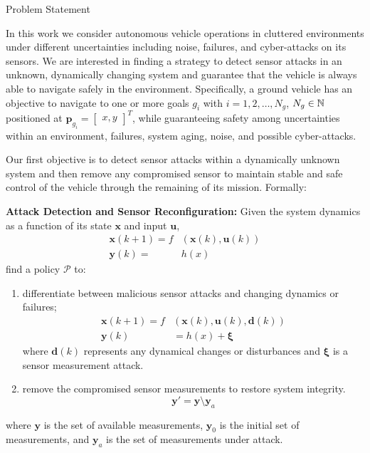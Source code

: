 \begin{section}{Problem Statement}
	
\label{sec:problem}

In this work we consider autonomous vehicle operations in cluttered environments under different uncertainties including noise, failures, and cyber-attacks on its sensors. 
We are interested in finding a strategy to detect sensor attacks in an unknown, dynamically changing system and guarantee that the vehicle is always able to navigate safely in the environment. Specifically, a ground vehicle has an objective to navigate to one or more goals $g_i$ with $ i = 1, 2, \dots, N_g$, $N_g \in \mathbb{N}$ positioned at $\bm{p}_{g_i}={\begin{bmatrix} x,y \end{bmatrix}}^T$, while guaranteeing safety among uncertainties within an environment, failures, system aging, noise, and possible cyber-attacks.



Our first objective is to detect sensor attacks within a dynamically unknown system and then remove any compromised sensor to maintain stable and safe control of the vehicle through the remaining of its mission. Formally:

\begin{problem} 
\label{problem1} {\textbf{Attack Detection and Sensor Reconfiguration:}} 
 Given the system dynamics as a function of its state $ \bm{x} $ and input $ \bm{u}$,
	\begin{equation}
	\begin{split}
		\bm{x}(k+1) = f&(\bm{x}(k), \bm{u}(k)) \\
		\bm{y}(k)=&h(x)
    \end{split}
	\end{equation}
find a policy $\mathcal{P}$ to:
\begin{enumerate}
	\item differentiate between malicious sensor attacks and changing dynamics or failures; 
	\begin{equation}
	\begin{split}
	\label{eq:detect_attack}
	    \bm{x}(k+1) = f&(\bm{x}(k), \bm{u}(k), \bm{d}(k)) \\
	    \bm{y}(k)&=h(x) + \bm{\xi}
	\end{split}    
	\end{equation}
	where $\bm{d}(k)$ represents any dynamical changes or disturbances and $\bm{\xi}$ is a sensor measurement attack.
	\item remove the compromised sensor measurements to restore system integrity.
	\begin{equation}
	\label{eq:remove_sensors}
	    \bm{y}'=\bm{y} \setminus \bm{y}_a
	\end{equation}
\end{enumerate}
where $\bm{y}$ is the set of available measurements, $\bm{y}_0$ is the initial set of measurements, and $\bm{y}_a$ is the set of measurements under attack.



\end{problem}
\end{section}
